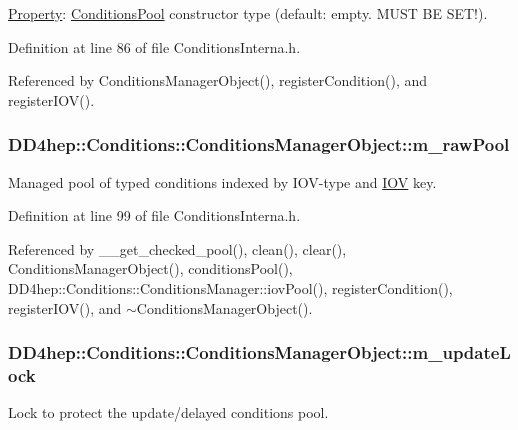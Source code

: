 \hyperlink{class_d_d4hep_1_1_property}{Property}: \hyperlink{class_d_d4hep_1_1_conditions_1_1_conditions_pool}{ConditionsPool} constructor type (default: empty. MUST BE SET!). 

Definition at line 86 of file ConditionsInterna.h.

Referenced by ConditionsManagerObject(), registerCondition(), and registerIOV().\hypertarget{class_d_d4hep_1_1_conditions_1_1_conditions_manager_object_a90c9b5060b3a6299aa7d5d4e9a0d8105}{
\subsubsection[{m\_\-rawPool}]{ {\bf DD4hep::Conditions::ConditionsManagerObject::m\_\-rawPool}}}
\label{class_d_d4hep_1_1_conditions_1_1_conditions_manager_object_a90c9b5060b3a6299aa7d5d4e9a0d8105}


Managed pool of typed conditions indexed by IOV-\/type and \hyperlink{class_d_d4hep_1_1_i_o_v}{IOV} key. 

Definition at line 99 of file ConditionsInterna.h.

Referenced by \_\-\_\-get\_\-checked\_\-pool(), clean(), clear(), ConditionsManagerObject(), conditionsPool(), DD4hep::Conditions::ConditionsManager::iovPool(), registerCondition(), registerIOV(), and $\sim$ConditionsManagerObject().\hypertarget{class_d_d4hep_1_1_conditions_1_1_conditions_manager_object_a4da3e311e9b9121fef58f2cd80da12f9}{
\subsubsection[{m\_\-updateLock}]{ {\bf DD4hep::Conditions::ConditionsManagerObject::m\_\-updateLock}}}
\label{class_d_d4hep_1_1_conditions_1_1_conditions_manager_object_a4da3e311e9b9121fef58f2cd80da12f9}


Lock to protect the update/delayed conditions pool. 

